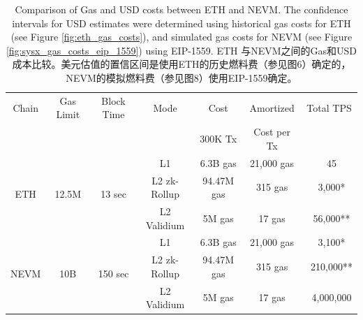 \documentclass{ctexart}
\begin{document}
\begin{table}[h!]
\centering
\begin{tabular}{ |c|c|c|c|c|c|c|   } 
\hline
Chain & Gas  Limit & Block Time & Mode & Cost  & Amortized  & Total TPS \\
 &  &  &  &  300K Tx  & Cost per Tx  &  \\ 
\hline
\multirow{3}{*}{ETH} & \multirow{3}{*}{12.5M} & \multirow{3}{*}{13 sec} & L1 & 6.3B gas  & 21,000 gas  & ~45  \\ 
\multirow{3}{*}{} & \multirow{3}{*}{} & \multirow{3}{*}{} & L2 zk-Rollup & 94.47M gas  & 315 gas & ~3,000* \\ 
\multirow{3}{*}{} & \multirow{3}{*}{} & \multirow{3}{*}{} & L2 Validium  & 5M gas  & 17 gas & ~56,000** \\ 
\hline

\multirow{3}{*}{NEVM} & \multirow{3}{*}{10B} & \multirow{3}{*}{150 sec} & L1 & 6.3B gas  & 21,000 gas  & ~3,100*\\ 
\multirow{3}{*}{} & \multirow{3}{*}{} & \multirow{3}{*}{} & L2 zk-Rollup & 94.47M gas  & 315 gas & ~210,000**\\ 
\multirow{3}{*}{} & \multirow{3}{*}{} & \multirow{3}{*}{} & L2 Validium  & 5M gas  & 17 gas & ~4,000,000 \\ 
\hline

\end{tabular}
\caption{Comparison of Gas and USD costs between ETH and NEVM. The confidence intervals for USD estimates were determined using historical gas costs for ETH (see Figure \ref{fig:eth_gas_costs}), and simulated gas costs for NEVM (see Figure \ref{fig:sysx_gas_costs_eip_1559}) using EIP-1559. ETH 与NEVM之间的Gas和USD成本比较。美元估值的置信区间是使用ETH的历史燃料费（参见图6）确定的，NEVM的模拟燃料费（参见图8）使用EIP-1559确定。}
\label{table:gas_cost_estimates}
\end{table}
\end{document}
